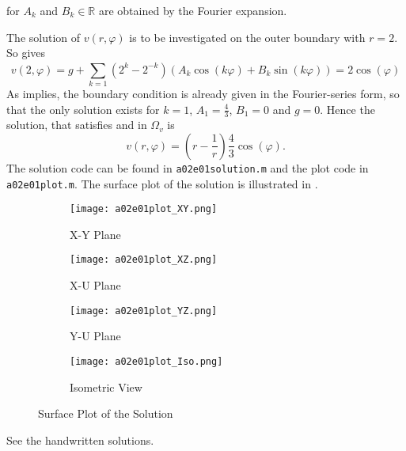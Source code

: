 for $A_k$ and $B_k \in \mathbb{R}$ are obtained by the Fourier expansion.
\par
The solution of $v(r, \varphi)$ is to be investigated on the outer boundary with $r = 2$.
So gives
\begin{equation}
	\label{eq:vBoundary}
	v(2, \varphi) = g + \sum_{k=1}^{} (2^k - 2^{-k}) \left( A_k \cos{(k \varphi)} + B_k \sin(k \varphi)\right) = 2 \cos{(\varphi)}
\end{equation}
As  implies, the boundary condition is already given in the Fourier-series form, so that the only solution exists for $k = 1$, $A_1 = \frac{4}{3}$, $B_1 = 0$ and $g=0$.
Hence the solution, that satisfies  and  in $\Omega_v$ is
\begin{equation}
	\label{eq:vSol}
	v(r, \varphi) = \left(r - \frac{1}{r}\right) \frac{4}{3} \cos{(\varphi)}
	\text{.}
\end{equation}
%
The solution code can be found in \texttt{a02e01solution.m} and the plot code in \texttt{a02e01plot.m}.
The surface plot of the  solution is illustrated in .
\begin{figure}[H]
\vspace*{\FigUpperVSpace}
\def\MeshFigWidth{220pt}
	\begin{subfigure}{0.5\hsize}
		\centering
		\texttt{[image: a02e01plot\_XY.png]} 
		\caption{X-Y Plane}
		\label{fig:a02e01plot_XY}
	\end{subfigure}
	\begin{subfigure}{0.5\hsize}
		\centering
		\texttt{[image: a02e01plot\_XZ.png]} 
		\caption{X-U Plane}
		\label{fig:a02e01plot_XZ}
	\end{subfigure}
	\vfill
	\begin{subfigure}{0.5\hsize}
		\centering
		\texttt{[image: a02e01plot\_YZ.png]} 
		\caption{Y-U Plane}
		\label{fig:a02e01plot_YZ}
	\end{subfigure}
	\begin{subfigure}{0.5\hsize}
		\centering
		\texttt{[image: a02e01plot\_Iso.png]} 
		\caption{Isometric View}
		\label{fig:a02e01plot_Iso}
	\end{subfigure}
	\caption{Surface Plot of the Solution}
	\label{fig:a02e01plot}
\end{figure}

%
 See the handwritten solutions.

